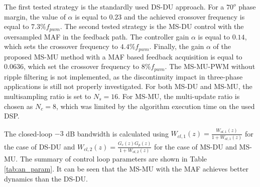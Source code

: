 \documentclass[conference]{IEEEtran}
\begin{document}
The first tested strategy is the standardly used DS-DU approach. For a $70^o$ phase margin, the value of $\alpha$ is equal to $0.23$ and the achieved crossover frequency is equal to $7.3 \% f_{pwm}$.
The second tested strategy is the MS-DU control with the oversampled MAF in the feedback path. The controller gain $\alpha$ is equal to $0.14$, which sets the crossover frequency to $4.4 \% f_{pwm}$.
Finally, the gain $\alpha$ of the proposed MS-MU method with a MAF based feedback acquisition is equal to $0.0636$, which set the crossover frequency to $8 \%  f_{pwm}$. The MS-MU-PWM without ripple filtering is not implemented, as the discontinuity impact in three-phase applications is still not properly investigated.
For both MS-DU and MS-MU, the multisampling ratio is set to $N_s = 16$. For MS-MU, the multi-update ratio is chosen as $N_c = 8$, which was limited by the algorithm execution time on the used DSP.

The closed-loop $-3$ dB bandwidth is calculated using $W_{cl,1}(z) = \frac{W_{ol,1}(z)}{1+W_{ol,1}(z)}$ for the case of DS-DU and $W_{cl,2}(z) = \frac{G_c(z) G_p(z)}{1+W_{ol,2}(z)}$ for the case of MS-DU and MS-MU. The summary of control loop parameters are shown in Table \ref{tab:an_param}. It can be seen that the MS-MU with the MAF achieves better dynamics than the DS-DU.
\end{document}
